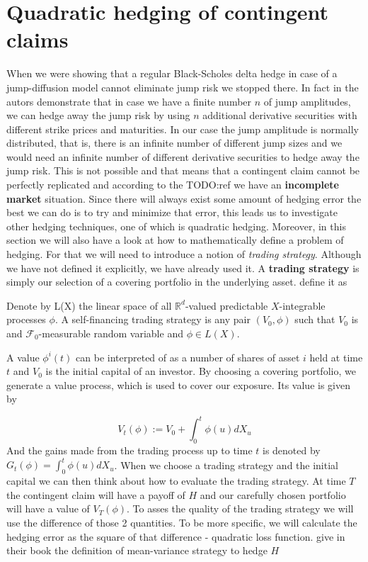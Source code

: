 \documentclass[times, utf8, diplomski]{fer}
\begin{document}
\section{Quadratic hedging of contingent claims}
When we were showing that a regular Black-Scholes delta hedge in case of a jump-diffusion model cannot eliminate jump risk we stopped there. In fact in \cite{chiarella_derivative_2015} the autors demonstrate that in case we have a finite number $n$ of jump amplitudes, we can hedge away the jump risk by using $n$ additional derivative securities with different strike prices and maturities. In our case the jump amplitude is normally distributed, that is, there is an infinite number of different jump sizes and we would need an infinite number of different derivative securities to hedge away the jump risk. This is not possible and that means that a contingent claim cannot be perfectly replicated and according to the TODO:ref{} we have an \textbf{incomplete market} situation. Since there will always exist some amount of hedging error the best we can do is to try and minimize that error, this leads us to investigate other hedging techniques, one of which is quadratic hedging.
Moreover, in this section we will also have a look at how to mathematically define a problem of hedging. For that we will need to introduce a notion of \textit{trading strategy}. Although we have not defined it explicitly, we have already used it. A \textbf{trading strategy} is simply our selection of a covering portfolio in the underlying asset. \cite{bingham_risk-neutral_2004} define it as

\begin{definition}
	Denote by L(X) the linear space of all $\mathbb{R}^d$-valued predictable $X$-integrable processes $\phi$. A self-financing trading strategy is any pair $(V_0, \phi)$ such that $V_0$ is and $\mathcal{F}_0$-measurable random variable and $\phi \in L(X)$.
\end{definition}
\noindent A value $\phi^i(t)$ can be interpreted of as a number of shares of asset $i$ held at time $t$ and $V_0$ is the initial capital of an investor. By choosing a covering portfolio, we generate a value process, which is used to cover our exposure. Its value is given by

\begin{equation}
	V_t(\phi) := V_0 + \int_0^t \phi(u) dX_u
\end{equation} 
And the gains made from the trading process up to time $t$ is denoted by $G_t(\phi)=\int_0^t \phi(u)dX_u$. When we choose a trading strategy and the initial capital we can then think about how to evaluate the trading strategy. At time $T$ the contingent claim will have a payoff of $H$ and our carefully chosen portfolio will have a value of $V_T(\phi)$. To asses the quality of the trading strategy we will use the difference of those 2 quantities. To be more specific, we will calculate the hedging error as the square of that difference - quadratic loss function. \cite{bingham_risk-neutral_2004} give in their book the definition of mean-variance strategy to hedge $H$
\end{document}
